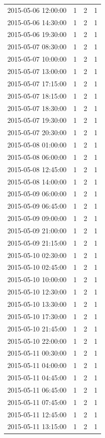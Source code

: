 \begin{tabular}{lrrr}
2015-05-06 12:00:00 & 1 & 2 & 1 \\
2015-05-06 14:30:00 & 1 & 2 & 1 \\
2015-05-06 19:30:00 & 1 & 2 & 1 \\
2015-05-07 08:30:00 & 1 & 2 & 1 \\
2015-05-07 10:00:00 & 1 & 2 & 1 \\
2015-05-07 13:00:00 & 1 & 2 & 1 \\
2015-05-07 17:15:00 & 1 & 2 & 1 \\
2015-05-07 18:15:00 & 1 & 2 & 1 \\
2015-05-07 18:30:00 & 1 & 2 & 1 \\
2015-05-07 19:30:00 & 1 & 2 & 1 \\
2015-05-07 20:30:00 & 1 & 2 & 1 \\
2015-05-08 01:00:00 & 1 & 2 & 1 \\
2015-05-08 06:00:00 & 1 & 2 & 1 \\
2015-05-08 12:45:00 & 1 & 2 & 1 \\
2015-05-08 14:00:00 & 1 & 2 & 1 \\
2015-05-09 06:00:00 & 1 & 2 & 1 \\
2015-05-09 06:45:00 & 1 & 2 & 1 \\
2015-05-09 09:00:00 & 1 & 2 & 1 \\
2015-05-09 21:00:00 & 1 & 2 & 1 \\
2015-05-09 21:15:00 & 1 & 2 & 1 \\
2015-05-10 02:30:00 & 1 & 2 & 1 \\
2015-05-10 02:45:00 & 1 & 2 & 1 \\
2015-05-10 10:00:00 & 1 & 2 & 1 \\
2015-05-10 12:30:00 & 1 & 2 & 1 \\
2015-05-10 13:30:00 & 1 & 2 & 1 \\
2015-05-10 17:30:00 & 1 & 2 & 1 \\
2015-05-10 21:45:00 & 1 & 2 & 1 \\
2015-05-10 22:00:00 & 1 & 2 & 1 \\
2015-05-11 00:30:00 & 1 & 2 & 1 \\
2015-05-11 04:00:00 & 1 & 2 & 1 \\
2015-05-11 04:45:00 & 1 & 2 & 1 \\
2015-05-11 06:45:00 & 1 & 2 & 1 \\
2015-05-11 07:45:00 & 1 & 2 & 1 \\
2015-05-11 12:45:00 & 1 & 2 & 1 \\
2015-05-11 13:15:00 & 1 & 2 & 1 \\

\end{tabular}
